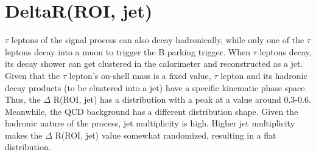 \section{DeltaR(ROI, jet)}\label{ref:jetdR}
$\tau$ leptons of the signal process can also decay hadronically, while only one of the $\tau$ leptons decay into a muon to trigger the B parking trigger.
When $\tau$ leptons decay, its decay shower can get clustered in the calorimeter and reconstructed as a jet.
Given that the $\tau$ lepton's on-shell mass is a fixed value, $\tau$ lepton and its hadronic decay products (to be clustered into a jet) have a specific kinematic phase space.
Thus, the $\Delta$ R(ROI, jet) has a distribution with a peak at a value around 0.3-0.6.
Meanwhile, the QCD background has a different distribution shape.
Given the hadronic nature of the process, jet multiplicity is high.
Higher jet multiplicity makes the $\Delta$ R(ROI, jet) value somewhat randomized, resulting in a flat distribution.



